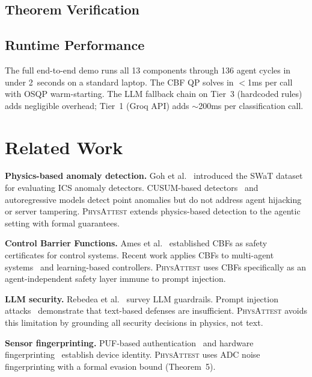 \documentclass[journal]{IEEEtran}
\newcommand{\physattest}{\textsc{PhysAttest}}
\begin{document}


\subsection{Theorem Verification}



\subsection{Runtime Performance}

The full end-to-end demo runs all 13 components through 136 agent cycles in under 2~seconds on a standard laptop. The CBF QP solves in $<$1ms per call with OSQP warm-starting. The LLM fallback chain on Tier~3 (hardcoded rules) adds negligible overhead; Tier~1 (Groq API) adds $\sim$200ms per classification call.


\section{Related Work}
\label{sec:related}

\textbf{Physics-based anomaly detection.} Goh et al.~\cite{goh2017dataset} introduced the SWaT dataset for evaluating ICS anomaly detectors. CUSUM-based detectors~\cite{cardenas2011attacks} and autoregressive models detect point anomalies but do not address agent hijacking or server tampering. \physattest{} extends physics-based detection to the agentic setting with formal guarantees.

\textbf{Control Barrier Functions.} Ames et al.~\cite{ames2017control} established CBFs as safety certificates for control systems. Recent work applies CBFs to multi-agent systems~\cite{wang2017safety} and learning-based controllers. \physattest{} uses CBFs specifically as an agent-independent safety layer immune to prompt injection.

\textbf{LLM security.} Rebedea et al.~\cite{rebedea2023nemo} survey LLM guardrails. Prompt injection attacks~\cite{perez2022ignore} demonstrate that text-based defenses are insufficient. \physattest{} avoids this limitation by grounding all security decisions in physics, not text.

\textbf{Sensor fingerprinting.} PUF-based authentication~\cite{suh2007physical} and hardware fingerprinting~\cite{dey2014provably} establish device identity. \physattest{} uses ADC noise fingerprinting with a formal evasion bound (Theorem~5).
\end{document}
